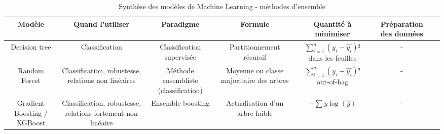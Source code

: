 \begin{table}[h!]
\scriptsize
\begin{tabularx}{\textwidth}{|C|C|C|C|C|C|C|}
\hline
\textbf{Modèle}                                    & \textbf{Quand l'utiliser}                                                                 & \textbf{Paradigme}                   & \textbf{Formule}                                                                & \textbf{Quantité à minimiser}                                                                      & \textbf{Préparation des données}  \\
\hline

Decision tree                                      & Classification                                                                            & Classification supervisée            & Partitionnement récursif                                                        & $\sum_{i=1}^{n}(y_i - \hat{y_i})²$ dans les feuilles                                               & -               \\
\hline

Random Forest                                      & Classification, robustesse, relations non linéaires                                       & Méthode ensembliste (classification) & Moyenne ou classe majoritaire des arbres                                        & $\sum_{i=1}^{n}(y_i - \hat{y_i})²$ out-of-bag                                                      & -               \\
\hline

Gradient Boosting / XGBoost                        & Classification, robustesse, relations fortement non linéaire                              & Ensemble boosting                    & Actualisation d'un arbre faible                                                 & $-\sum y\log(\hat y)$                                                                              & -               \\
\hline

\end{tabularx}
\caption{Synthèse des modèles de Machine Learning - méthodes d'ensemble}
\end{table}

\newpage

